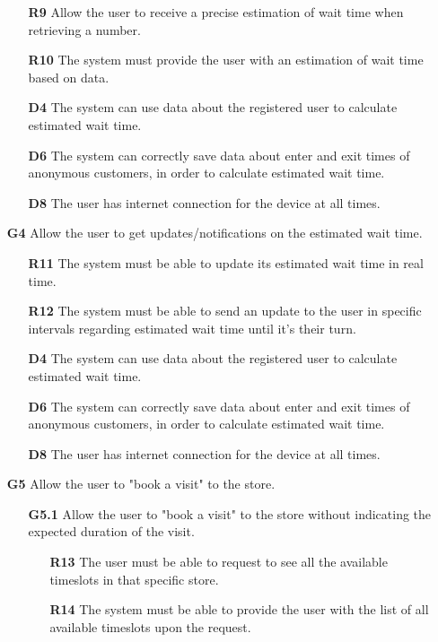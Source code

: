 \begin{enumerate}
	\begin{enumerate}
		\item [\textbf{R9}] Allow the user to receive a precise estimation of wait time when retrieving a number.
		\item [\textbf{R10}] The system must provide the user with an estimation of wait time based on data.
		\item [\textbf{D4}] The system can use data about the registered user to calculate estimated wait time.
		\item [\textbf{D6}] The system can correctly save data about enter and exit times of anonymous customers, in order to calculate estimated wait time.
		\item [\textbf{D8}] The user has internet connection for the device at all times.
	\end{enumerate}
	\item [\textbf{G4}] Allow the user to get updates/notifications on the estimated wait time.
	\begin{enumerate}
		\item [\textbf{R11}] The system must be able to update its estimated wait time in real time.
		\item [\textbf{R12}] The system must be able to send an update to the user in specific intervals regarding estimated wait time until it's their turn.
		\item [\textbf{D4}] The system can use data about the registered user to calculate estimated wait time.
		\item [\textbf{D6}] The system can correctly save data about enter and exit times of anonymous customers, in order to calculate estimated wait time.
		\item [\textbf{D8}] The user has internet connection for the device at all times.
	\end{enumerate}
	\item [\textbf{G5}] Allow the user to "book a visit" to the store.
	\begin{enumerate}
		\item [\textbf{G5.1}] Allow the user to "book a visit" to the store without indicating the expected duration of the visit.
		\begin{enumerate}
			\item [\textbf{R13}] The user must be able to request to see all the available timeslots in that specific store.
			\item [\textbf{R14}] The system must be able to provide the user with the list of all available timeslots upon the request.

\end{enumerate}
\end{enumerate}
\end{enumerate}
